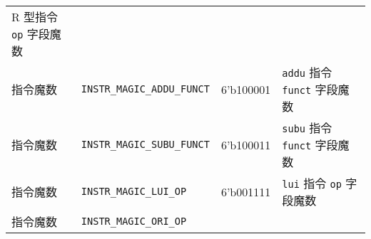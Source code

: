 \begin{longtable}[]{@{}llll@{}}
\begin{minipage}[t]{0.22\columnwidth}
R 型指令 \texttt{op} 字段魔数\strut
\end{minipage}\tabularnewline
\begin{minipage}[t]{0.22\columnwidth}\raggedright
指令魔数\strut
\end{minipage} & \begin{minipage}[t]{0.22\columnwidth}\raggedright
\texttt{INSTR\_MAGIC\_ADDU\_FUNCT}\strut
\end{minipage} & \begin{minipage}[t]{0.22\columnwidth}\raggedright
6'b100001\strut
\end{minipage} & \begin{minipage}[t]{0.22\columnwidth}\raggedright
\texttt{addu} 指令 \texttt{funct} 字段魔数\strut
\end{minipage}\tabularnewline
\begin{minipage}[t]{0.22\columnwidth}\raggedright
指令魔数\strut
\end{minipage} & \begin{minipage}[t]{0.22\columnwidth}\raggedright
\texttt{INSTR\_MAGIC\_SUBU\_FUNCT}\strut
\end{minipage} & \begin{minipage}[t]{0.22\columnwidth}\raggedright
6'b100011\strut
\end{minipage} & \begin{minipage}[t]{0.22\columnwidth}\raggedright
\texttt{subu} 指令 \texttt{funct} 字段魔数\strut
\end{minipage}\tabularnewline
\begin{minipage}[t]{0.22\columnwidth}\raggedright
指令魔数\strut
\end{minipage} & \begin{minipage}[t]{0.22\columnwidth}\raggedright
\texttt{INSTR\_MAGIC\_LUI\_OP}\strut
\end{minipage} & \begin{minipage}[t]{0.22\columnwidth}\raggedright
6'b001111\strut
\end{minipage} & \begin{minipage}[t]{0.22\columnwidth}\raggedright
\texttt{lui} 指令 \texttt{op} 字段魔数\strut
\end{minipage}\tabularnewline
\begin{minipage}[t]{0.22\columnwidth}\raggedright
指令魔数\strut
\end{minipage} & \begin{minipage}[t]{0.22\columnwidth}\raggedright
\texttt{INSTR\_MAGIC\_ORI\_OP}\strut
\end{minipage} & \begin{minipage}[t]{0.22\columnwidth}\raggedright

\end{minipage}
\end{longtable}
